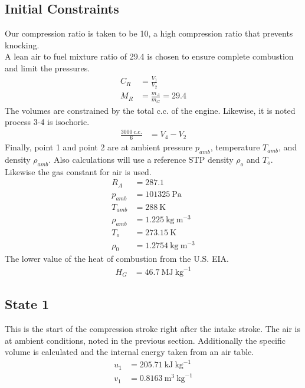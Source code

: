 \documentclass[10pt,a4paper]{article}
\begin{document}
	\subsection*{Initial Constraints}
	Our compression ratio is taken to be 10, a high compression ratio that prevents knocking. \\
	A lean air to fuel mixture ratio of 29.4 is chosen to ensure complete combustion and limit the pressures.
	\begin{align}
		C_R &= \frac{V_1}{V_2} \\
		M_R &= \frac{m_A}{m_G} = 29.4
	\end{align}
	The volumes are constrained by the total c.c. of the engine. Likewise, it is noted process 3-4 is isochoric.
	\begin{align}
		\frac{3000\ \text{c.c.}}{6} &= V_4-V_2 
	\end{align}
	Finally, point 1 and point 2 are at ambient pressure $p_{amb}$, temperature $T_{amb}$, and density $\rho_{amb}$. Also calculations will use a reference STP density $\rho_o$ and $T_o$. Likewise the gas constant for air is used.
	\begin{align}
		R_A &= 287.1 \\
		p_{amb} &= 101325\ \text{Pa} \\
		T_{amb} &= 288\ \text{K} \\
		\rho_{amb} &= 1.225\ \text{kg}\ \text{m}^{-3}\\
		T_o &= 273.15\ \text{K} \\
		\rho_0 &= 1.2754\ \text{kg}\ \text{m}^{-3}
	\end{align}
	The lower value of the heat of combustion from the U.S. EIA.
	\begin{align}
		H_G &= 46.7\ \text{MJ}\ \text{kg}^{-1}
	\end{align}
	\subsection*{State 1}
	This is the start of the compression stroke right after the intake stroke. The air is at ambient conditions, noted in the previous section. Additionally the specific volume is calculated and the internal energy taken from an air table.
	\begin{align}
		u_1 &= 205.71\ \text{kJ}\ \text{kg}^{-1}\\
		v_1 &= 0.8163\ \text{m}^3\ \text{kg}^{-1}
	\end{align}
	
\end{document}
